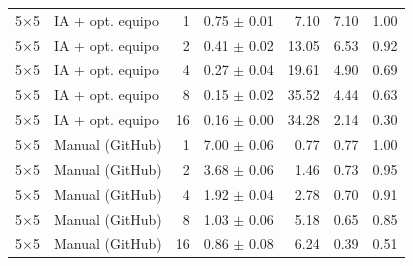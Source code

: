 \begin{tabular}{llrrrrr}
5$\times$5 & IA + opt. equipo & 1 & 0.75 $\pm$ 0.01 & 7.10 & 7.10 & 1.00 \\
5$\times$5 & IA + opt. equipo & 2 & 0.41 $\pm$ 0.02 & 13.05 & 6.53 & 0.92 \\
5$\times$5 & IA + opt. equipo & 4 & 0.27 $\pm$ 0.04 & 19.61 & 4.90 & 0.69 \\
5$\times$5 & IA + opt. equipo & 8 & 0.15 $\pm$ 0.02 & 35.52 & 4.44 & 0.63 \\
5$\times$5 & IA + opt. equipo & 16 & 0.16 $\pm$ 0.00 & 34.28 & 2.14 & 0.30 \\
5$\times$5 & Manual (GitHub) & 1 & 7.00 $\pm$ 0.06 & 0.77 & 0.77 & 1.00 \\
5$\times$5 & Manual (GitHub) & 2 & 3.68 $\pm$ 0.06 & 1.46 & 0.73 & 0.95 \\
5$\times$5 & Manual (GitHub) & 4 & 1.92 $\pm$ 0.04 & 2.78 & 0.70 & 0.91 \\
5$\times$5 & Manual (GitHub) & 8 & 1.03 $\pm$ 0.06 & 5.18 & 0.65 & 0.85 \\
5$\times$5 & Manual (GitHub) & 16 & 0.86 $\pm$ 0.08 & 6.24 & 0.39 & 0.51 \\
\bottomrule
\end{tabular}
